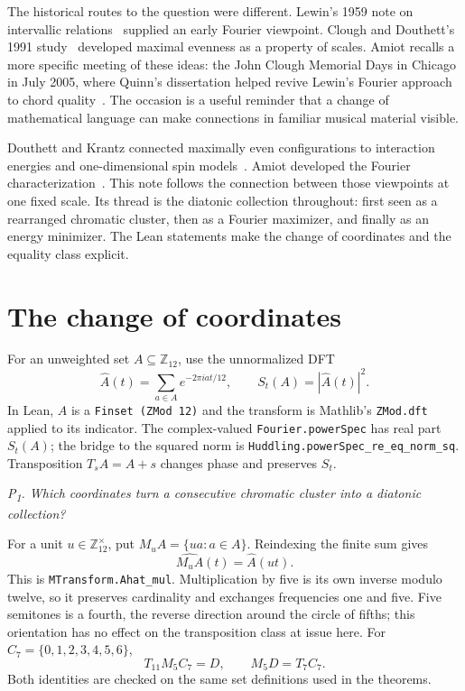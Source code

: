 \documentclass[11pt]{article}
\newcommand{\lean}[1]{\texttt{#1}}
\newcommand{\Ztwelve}{\mathbb{Z}_{12}}
\newcommand{\Ahat}{\widehat A}
\newcommand{\question}[1]{\smallskip\noindent\textit{#1}\smallskip}
\begin{document}
The historical routes to the question were different. Lewin's 1959 note on intervallic
relations~\cite{Lewin} supplied an early Fourier viewpoint. Clough and Douthett's 1991
study~\cite{CloughDouthett} developed maximal evenness as a property of scales.
Amiot recalls a more specific meeting of these ideas: the John Clough Memorial Days in
Chicago in July 2005, where Quinn's dissertation helped revive Lewin's Fourier approach
to chord quality~\cite{Amiot2009}. The occasion is a useful reminder that a change of
mathematical language can make connections in familiar musical material visible.

Douthett and Krantz connected maximally even configurations to interaction energies and
one-dimensional spin models~\cite{DK}. Amiot developed the Fourier characterization~\cite{Amiot2007}.
This note follows the connection between those viewpoints at one fixed scale. Its thread is
the diatonic collection throughout: first seen as a rearranged chromatic cluster, then as
a Fourier maximizer, and finally as an energy minimizer. The Lean statements make the
change of coordinates and the equality class explicit.

\section{The change of coordinates}\label{sec:coordinates}

For an unweighted set $A\subseteq\Ztwelve$, use the unnormalized DFT
\begin{equation}\label{eq:dft}
  \Ahat(t)=\sum_{a\in A}e^{-2\pi i at/12},\qquad
  S_t(A)=|\Ahat(t)|^2.
\end{equation}
In Lean, $A$ is a \lean{Finset (ZMod 12)} and the transform is Mathlib's
\lean{ZMod.dft} applied to its indicator. The complex-valued
\lean{Fourier.powerSpec} has real part $S_t(A)$; the bridge to the squared norm is
\lean{Huddling.powerSpec\_re\_eq\_norm\_sq}.
Transposition $T_sA=A+s$ changes phase and preserves $S_t$.

\question{P\textsubscript{1}. Which coordinates turn a consecutive chromatic cluster into
a diatonic collection?}

For a unit $u\in\Ztwelve^\times$, put $M_uA=\{ua:a\in A\}$. Reindexing the finite sum gives
\begin{equation}\label{eq:mtransform}
  \widehat{M_uA}(t)=\Ahat(ut).
\end{equation}
This is \lean{MTransform.Ahat\_mul}. Multiplication by five is its own inverse modulo twelve,
so it preserves cardinality and exchanges frequencies one and five. Five semitones is a
fourth, the reverse direction around the circle of fifths; this orientation has no effect
on the transposition class at issue here.
For $C_7=\{0,1,2,3,4,5,6\}$,
\[
 T_{11}M_5C_7=D,\qquad M_5D=T_7C_7.
\]
Both identities are checked on the same set definitions used in the theorems.
\end{document}
